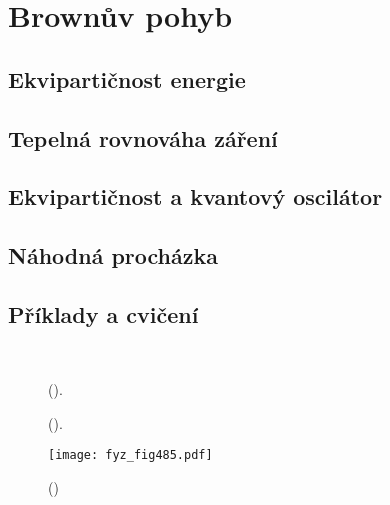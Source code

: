 \setchaptertoc
\chapter{Brownův pohyb}\label{fyz:IchapXLI}

  \section{Ekvipartičnost energie}\label{fyz:IchapXLIsecI}
  \section{Tepelná rovnováha záření}\label{fyz:IchapXLIsecII}
  \section{Ekvipartičnost a kvantový oscilátor}\label{fyz:IchapXLIsecIII}
  \section{Náhodná procházka}\label{fyz:IchapXLIsecIV}
  \section{Příklady a cvičení}\label{fyz:IchapXLIsecV}

  \begin{figure}[hb!] %
    \centering
      \\
    \caption{
             (\cite[s.~601]{Feynman01}).}
    \label{fyz:fig483}
  \end{figure}

  \begin{figure}[hb!] %
    \centering
    \caption{
             (\cite[s.~601]{Feynman01}).}
    \label{fyz:fig484}
  \end{figure}

    \begin{figure}[ht!] %
      \centering
      \texttt{[image: fyz\_fig485.pdf]}
      \caption{ 
               (\cite[s.~707]{Feynman01})}
      \label{fyz:fig485}
    \end{figure}

